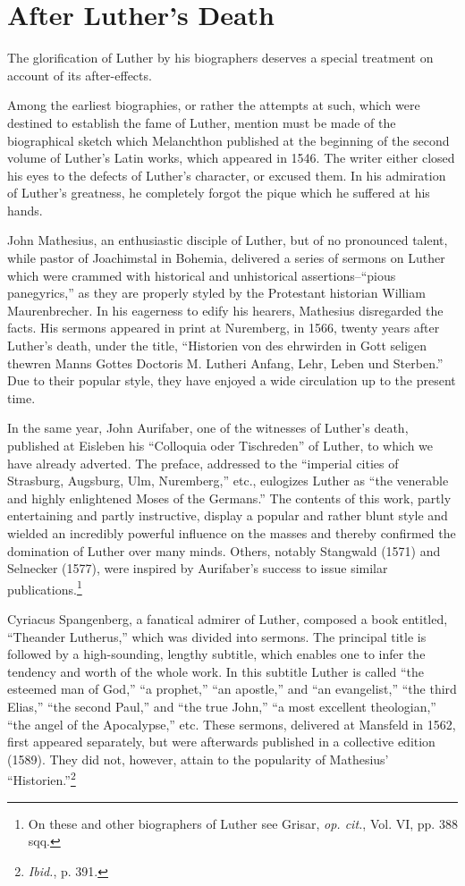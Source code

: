 \section{After Luther’s Death}

The glorification of Luther by his biographers deserves a special
treatment on account of its after-effects.

Among the earliest biographies, or rather the attempts at such,
which were destined to establish the fame of Luther, mention must
be made of the biographical sketch which Melanchthon published
at the beginning of the second volume of Luther’s Latin works, which
appeared in 1546. The writer either closed his eyes to the defects of
Luther’s character, or excused them. In his admiration of Luther’s
greatness, he completely forgot the pique which he suffered at his
hands.

John Mathesius, an enthusiastic disciple of Luther, but of no pronounced
talent, while pastor of Joachimstal in Bohemia, delivered a
series of sermons on Luther which were crammed with historical and
unhistorical assertions--“pious panegyrics,” as they are properly styled
by the Protestant historian William Maurenbrecher. In his eagerness
to edify his hearers, Mathesius disregarded the facts. His sermons appeared
in print at Nuremberg, in 1566, twenty years after Luther’s
death, under the title, “Historien von des ehrwirden in Gott seligen
thewren Manns Gottes Doctoris M. Lutheri Anfang, Lehr, Leben und
Sterben.” Due to their popular style, they have enjoyed a wide circulation
up to the present time.

In the same year, John Aurifaber, one of the witnesses of Luther’s
death, published at Eisleben his “Colloquia oder Tischreden” of Luther,
to which we have already adverted. The preface, addressed to the
“imperial cities of Strasburg, Augsburg, Ulm, Nuremberg,” etc.,
eulogizes Luther as “the venerable and highly enlightened Moses of
the Germans.” The contents of this work, partly entertaining and
partly instructive, display a popular and rather blunt style and wielded
an incredibly powerful influence on the masses and thereby confirmed
the domination of Luther over many minds. Others, notably Stangwald (1571)
and Selnecker (1577), were inspired by Aurifaber’s
success to issue similar publications.\footnote{On these and other biographers of Luther see Grisar, \textit{op. cit.}, Vol. VI, pp. 388 sqq.}

Cyriacus Spangenberg, a fanatical admirer of Luther, composed a
book entitled, “Theander Lutherus,” which was divided into sermons.
The principal title is followed by a high-sounding, lengthy subtitle,
which enables one to infer the tendency and worth of the whole
work. In this subtitle Luther is called “the esteemed man of God,”
“a prophet,” “an apostle,” and “an evangelist,” “the third Elias,”
“the second Paul,” and “the true John,” “a most excellent theologian,”
“the angel of the Apocalypse,” etc. These sermons, delivered
at Mansfeld in 1562, first appeared separately, but were afterwards
published in a collective edition (1589). They did not, however,
attain to the popularity of Mathesius’ “Historien.”\footnote{\textit{Ibid.}, p. 391.}

